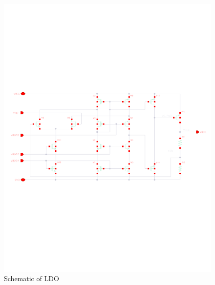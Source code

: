\documentclass[12pt,a4paper,UKenglish]{report}
\begin{document}
\begin{appendices}
\begin{figure} [!htbp]
 	\centering
  	\includegraphics[width=\textwidth]{appendix/schematic_ldo_l.pdf} 
 	\caption{Schematic of LDO} 
	\label{fig:appen_schematic_ldo} 
\end{figure}


\end{appendices}
\end{document}
